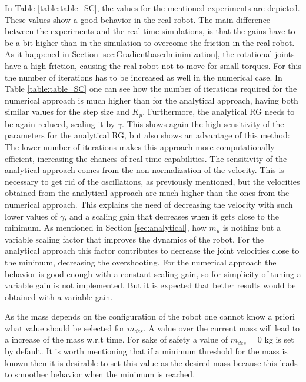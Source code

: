 In Table \ref{table:table_SC}, the values for the mentioned experiments are depicted. These values show a good behavior in the real robot. The main difference between the experiments and the real-time simulations, is that the gains have to be a bit higher than in the simulation to overcome the friction in the real robot. As it happened in Section \ref{sec:Gradientbasedminimization}, the rotational joints have a high friction, causing the real robot not to move for small torques. For this the number of iterations has to be increased as well in the numerical case. In Table \ref{table:table_SC} one can see how the number of iterations required for the numerical approach is much higher than for the analytical approach, having both similar values for the step size and $K_p$. Furthermore, the analytical RG needs to be again  reduced, scaling it by $\gamma$. This shows again the high sensitivity of the parameters for the analytical RG, but also shows an advantage of this method: The lower number of iterations makes this approach more computationally efficient, increasing the chances of real-time capabilities. The sensitivity of the analytical approach comes from the non-normalization of the velocity. This is necessary to get rid of the oscillations, as previously mentioned, but the velocities obtained from the analytical approach are much higher than the ones from the numerical approach. This explains the need of decreasing the velocity with such lower values of $\gamma$, and a scaling gain that decreases when it gets close to the minimum.
As mentioned in Section \ref{sec:analytical},  how $\dot{m}_u$ is nothing but a variable scaling factor that improves the dynamics of the robot. For the analytical approach this factor contributes to decrease the joint velocities close to the minimum, decreasing the overshooting.
For the numerical approach the behavior is good enough with a constant scaling gain, so for simplicity of tuning a variable gain is not implemented. But it is expected that better results would be obtained with a variable gain.


As the mass depends on the  configuration of the robot one cannot know a priori what value should be selected for $m_{des}$. A value over the current mass will lead to a increase of the mass w.r.t time. 
For sake of safety a value of $m_{des}=0$ kg is set by default. It is worth mentioning that if a minimum threshold for the mass is known then it is desirable to set this value as the desired mass because this leads to smoother behavior when the minimum is reached.




